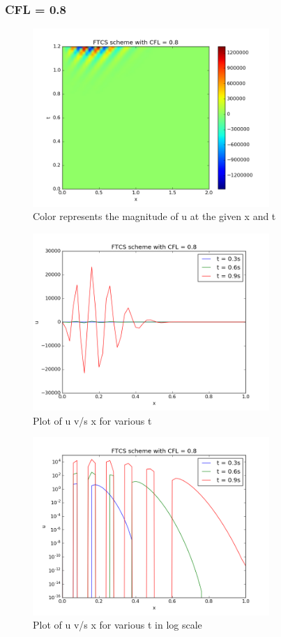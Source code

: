 \documentclass[11pt, a4paper]{article}
\begin{document}
\subsubsection{CFL = 0.8}
\begin{figure}[H]
 \centering
 \includegraphics[width = 0.8\textwidth]{FTCS1_08.png}
 \caption{Color represents the magnitude of u at the given x and t}
\end{figure}

\begin{figure}[H]
 \centering
 \includegraphics[width = 0.8\textwidth]{FTCS1_08_1.png}
 \caption{Plot of u v/s x for various t}
\end{figure}

\begin{figure}[H]
 \centering
 \includegraphics[width = 0.8\textwidth]{FTCS1_08_1_log.png}
 \caption{Plot of u v/s x for various t in log scale}
\end{figure}
\end{document}
